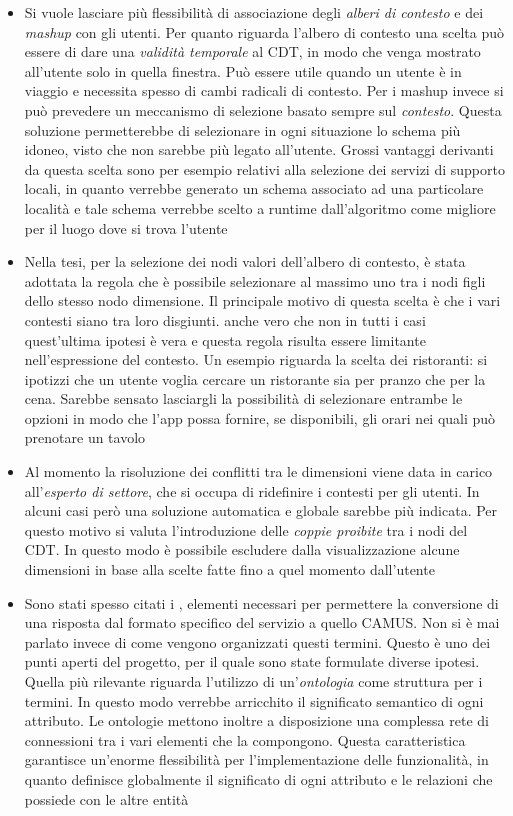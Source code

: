 \begin{itemize}
	\item
	Si vuole lasciare più flessibilità di associazione degli \emph{alberi di contesto} e dei \emph{mashup} con gli utenti. Per quanto riguarda l'albero di contesto una scelta può essere di dare una \emph{validità temporale} al CDT, in modo che venga mostrato all'utente solo in quella finestra. Può essere utile quando un utente è in viaggio e necessita spesso di cambi radicali di contesto. Per i mashup invece si può prevedere un meccanismo di selezione basato sempre sul \emph{contesto}. Questa soluzione permetterebbe di selezionare in ogni situazione lo schema più idoneo, visto che non sarebbe più legato all'utente. Grossi vantaggi derivanti da questa scelta sono per esempio relativi alla selezione dei servizi di supporto locali, in quanto verrebbe generato un schema associato ad una particolare località e tale schema verrebbe scelto a runtime dall'algoritmo come migliore per il luogo dove si trova l'utente
	\item
	Nella tesi, per la selezione dei nodi valori dell'albero di contesto, è stata adottata la regola che è possibile selezionare al massimo uno tra i nodi figli dello stesso nodo dimensione. Il principale motivo di questa scelta è che i vari contesti siano tra loro disgiunti. \upe anche vero che non in tutti i casi quest'ultima ipotesi è vera e questa regola risulta essere limitante nell'espressione del contesto. Un esempio riguarda la scelta dei ristoranti: si ipotizzi che un utente voglia cercare un ristorante sia per pranzo che per la cena. Sarebbe sensato lasciargli la possibilità di selezionare entrambe le opzioni in modo che l'app possa fornire, se disponibili, gli orari nei quali può prenotare un tavolo
	\item 
	Al momento la risoluzione dei conflitti tra le dimensioni viene data in carico all'\emph{esperto di settore}, che si occupa di ridefinire i contesti per gli utenti. In alcuni casi però una soluzione automatica e globale sarebbe più indicata. Per questo motivo si valuta l'introduzione delle \emph{coppie proibite} tra i nodi del CDT. In questo modo è possibile escludere dalla visualizzazione alcune dimensioni in base alla scelte fatte fino a quel momento dall'utente
	\item
	Sono stati spesso citati i , elementi necessari per permettere la conversione di una risposta dal formato specifico del servizio a quello CAMUS. Non si è mai parlato invece di come vengono organizzati questi termini. Questo è uno dei punti aperti del progetto, per il quale sono state formulate diverse ipotesi. Quella più rilevante riguarda l'utilizzo di un'\emph{ontologia} come struttura per i termini. In questo modo verrebbe arricchito il significato semantico di ogni attributo. Le ontologie mettono inoltre a disposizione una complessa rete di connessioni tra i vari elementi che la compongono. Questa caratteristica garantisce un'enorme flessibilità per l'implementazione delle funzionalità, in quanto definisce globalmente il significato di ogni attributo e le relazioni che possiede con le altre entità

\end{itemize}
